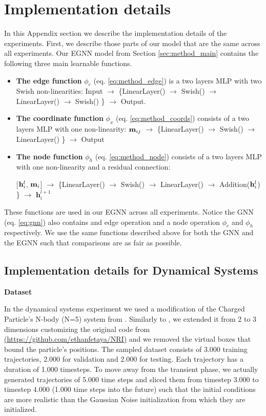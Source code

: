 \section{Implementation details} \label{sec:appendix_implementation}
In this Appendix section we describe the implementation details of the experiments.
First, we describe those parts of our model that are the same across all experiments. Our EGNN model from Section \ref{sec:method_main} contains the following three main learnable functions.

\begin{itemize}
    \item \textbf{The edge function} $\phi_e$ (eq. \ref{eq:method_edge}) is a two layers MLP with two Swish non-linearities: Input $\xrightarrow{}$ \{LinearLayer() $\xrightarrow{}$ Swish() $\xrightarrow{}$ LinearLayer() $\xrightarrow{}$ Swish() \} $\xrightarrow{}$ Output. 
    \item \textbf{The coordinate function} $\phi_x$ (eq. \ref{eq:method_coords}) consists of a two layers MLP with one non-linearity:  $\mathbf{m}_{ij}$ $\xrightarrow{}$ \{LinearLayer() $\xrightarrow{}$ Swish() $\xrightarrow{}$ LinearLayer() \} $\xrightarrow{}$ Output
    \item \textbf{The node function} $\phi_h$ (eq. \ref{eq:method_node}) consists of a two layers MLP with one non-linearity and a residual connection:
    
    [$\mathbf{h}_i^{l}$, $\mathbf{m}_i$] $\xrightarrow{}$ \{LinearLayer() $\xrightarrow{}$ Swish() $\xrightarrow{}$ LinearLayer() $\xrightarrow{}$ Addition($\mathbf{h}^l_i$) \} $\xrightarrow{}$ $\mathbf{h}^{l+1}_i$ 
\end{itemize}

These functions are used in our EGNN across all experiments. Notice the GNN (eq. \ref{eq:gnn}) also contains and edge operation and a node operation $\phi_e$ and $\phi_h$ respectively. We use the same functions described above for both the GNN and the EGNN such that comparisons are as fair as possible.

\subsection{Implementation details for Dynamical Systems}
\label{sec:appendix_implementation_dynamical}
\textbf{Dataset}

In the dynamical systems experiment we used a modification of the Charged Particle's N-body (N=5) system  from \cite{kipf2018neural}. Similarly to \cite{fuchs2020se}, we extended it from 2 to 3 dimensions customizing the original code from  \hyperlink{https://github.com/ethanfetaya/NRI}{(https://github.com/ethanfetaya/NRI)} and we removed the virtual boxes that bound the particle's positions. The sampled dataset consists of 3.000 training trajectories, 2.000 for validation and 2.000 for testing. Each trajectory has a duration of 1.000 timesteps. To move away from the transient phase, we actually generated trajectories of 5.000 time steps and sliced them from timestep $3.000$ to timestep $4.000$ (1.000 time steps into the future) such that the initial conditions are more realistic than the Gaussian Noise initialization from which they are initialized. 


